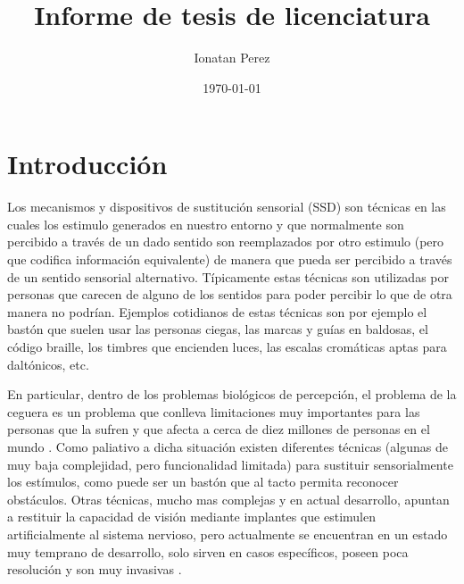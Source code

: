 \documentclass{article}
\title{Informe de tesis de licenciatura}
\author{Ionatan Perez}
\date{\today}
\begin{document}
\lstset{language=Pascal}          %

\maketitle

\clearpage 

\tableofcontents  %
\clearpage

\section{Introducción}

    Los mecanismos y dispositivos de sustitución sensorial (SSD) son técnicas en las cuales los estimulo generados en nuestro entorno y que normalmente son percibido a través de un dado sentido son reemplazados por otro estimulo (pero que codifica información equivalente) de manera que pueda ser percibido a través de un sentido sensorial alternativo. Típicamente estas técnicas son utilizadas por personas que carecen de alguno de los sentidos para poder percibir lo que de otra manera no podrían. Ejemplos cotidianos de estas técnicas son por ejemplo el bastón que suelen usar las personas ciegas, las marcas y guías en baldosas, el código braille, los timbres que encienden luces, las escalas cromáticas aptas para daltónicos, etc. 
    
    En particular, dentro de los problemas biológicos de percepción, el problema de la ceguera es un problema que conlleva limitaciones muy importantes para las personas que la sufren y que afecta a cerca de diez millones de personas en el mundo \cite{NroCiegos}. Como paliativo a dicha situación existen diferentes técnicas (algunas de muy baja complejidad, pero funcionalidad limitada) para sustituir sensorialmente los estímulos, como puede ser un bastón que al tacto permita reconocer obstáculos. Otras técnicas, mucho mas complejas y en actual desarrollo, apuntan a restituir la capacidad de visión mediante implantes que estimulen artificialmente al sistema nervioso\cite{Implantes1,Implantes2}, pero actualmente se encuentran en un estado muy temprano de desarrollo, solo sirven en casos específicos, poseen poca resolución y son muy invasivas \cite{Implantes3,Implantes4}. 
    
\end{document}
